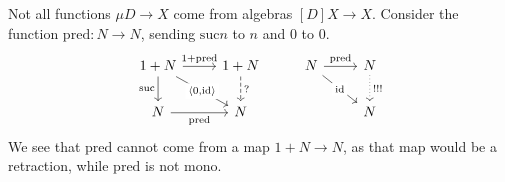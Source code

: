 \begin{remark}
    Not all functions $\mu D \to X$ come from algebras $[D] X \to X$. Consider the function $\mathrm{pred} : N \to N$, sending $\mathrm{suc} n$ to $n$ and 0 to 0.
    \[\begin{tikzcd}
        {1+N} & {1+N} & N & N \\
        N & N && N
        \arrow["{\mathrm{suc}}"', from=1-1, to=2-1]
        \arrow["{?}", dashed, from=1-2, to=2-2]
        \arrow["{1+\mathrm{pred}}", from=1-1, to=1-2]
        \arrow["{\mathrm{pred}}"', from=2-1, to=2-2]
        \arrow["{\langle0, \mathrm{id}\rangle}"{description}, from=1-1, to=2-2]
        \arrow["{\mathrm{id}}"{description}, from=1-3, to=2-4]
        \arrow["{\mathrm{pred}}", from=1-3, to=1-4]
        \arrow["{!!!}", dotted, from=1-4, to=2-4]
    \end{tikzcd}\]
    We see that $\mathrm{pred}$ cannot come from a map $1 + N \to N$, as that map would be a retraction, while $\mathrm{pred}$ is not mono.
\end{remark}


